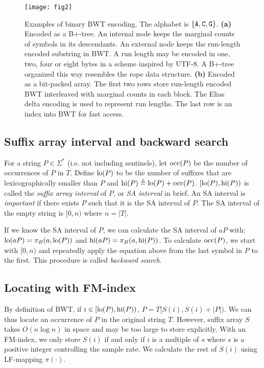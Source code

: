 \documentclass[webpdf,contemporary,large,namedate]{oup-authoring-template}%
\begin{document}
\begin{figure}[bt]
\centering
\texttt{[image: fig2]}
\caption{Examples of binary BWT encoding.
The alphabet is $\{{\tt A},{\tt C},{\tt G}\}$.
{\bf (a)} Encoded as a B+-tree.
An internal node keeps the marginal counts of symbols in its descendants.
An external node keeps the run-length encoded substring in BWT.
A run length may be encoded in one, two, four or eight bytes in a scheme inspired by UTF-8.
A B+-tree organized this way resembles the rope data structure.
{\bf (b)} Encoded as a bit-packed array.
The first two rows store run-length encoded BWT interleaved with marginal counts in each block.
The Elias delta encoding is used to represent run lengths.
The last row is an index into BWT for fast access.
}\label{fig:2}
\end{figure}

\subsection{Suffix array interval and backward search}

For a string $P\in\Sigma^*$ (i.e. not including sentinels), let ${\rm occ}(P)$ be the number of occurrences of $P$ in $T$.
Define ${\rm lo}(P)$ to be the number of suffixes that are lexicographically smaller than $P$
and ${\rm hi}(P)\triangleq {\rm lo}(P)+{\rm occ}(P)$.
$[{\rm lo}(P),{\rm hi}(P))$ is called the \emph{suffix array interval} of $P$, or \emph{SA interval} in brief.
An SA interval is \emph{important} if there exists $P$ such that it is the SA interval of $P$.
The SA interval of the empty string is $[0,n)$ where $n=|T|$.

If we know the SA interval of $P$, we can calculate the SA interval of $aP$ with:
${\rm lo}(aP)=\pi_B(a,{\rm lo}(P))$ and ${\rm hi}(aP)=\pi_B(a,{\rm hi}(P))$.
To calculate ${\rm occ}(P)$,
we start with $[0,n)$ and repeatedly apply the equation above from the last symbol in $P$ to the first.
This procedure is called \emph{backward search}.

\subsection{Locating with FM-index}

By definition of BWT, if $i\in[{\rm lo}(P),{\rm hi}(P))$, $P=T[S(i),S(i)+|P|)$.
We can thus locate an occurrence of $P$ in the original string $T$.
However, suffix array $S$ takes $O(n\log n)$ in space and may be too large to store explicitly.
With an FM-index, we only store $S(i)$ if and only if $i$ is a multiple of $s$ where $s$ is a positive integer controlling the sample rate.
We calculate the rest of $S(i)$ using LF-mapping $\pi(\cdot)$.
\end{document}
